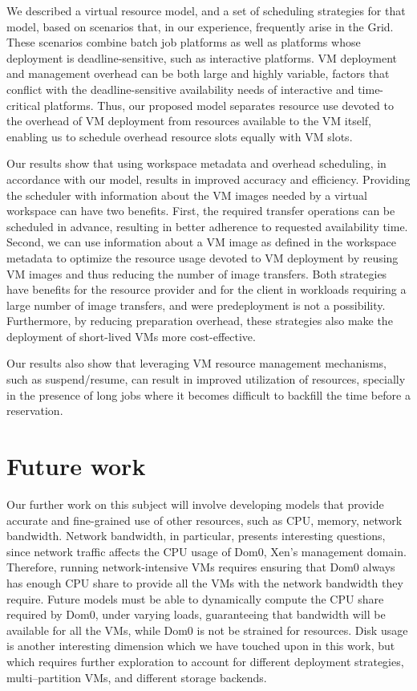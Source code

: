 We described a virtual resource model, and a set of scheduling
strategies for that model, based on scenarios that, in our experience,
frequently arise in the Grid. These scenarios combine batch job
platforms as well as platforms whose deployment is
deadline{}-sensitive, such as interactive platforms. VM deployment and
management overhead can be both large and highly variable, factors that
conflict with the deadline{}-sensitive availability needs of
interactive and time{}-critical platforms. Thus, our proposed model
separates resource use devoted to the overhead of VM deployment from
resources available to the VM itself, enabling us to schedule overhead
resource slots equally with VM slots.

Our results show that using workspace metadata and overhead scheduling, in accordance with our model, results in improved accuracy and efficiency. Providing the scheduler with information about the VM images needed by a virtual workspace can have two benefits. First, the required transfer operations can be scheduled in advance, resulting in better adherence to requested availability time. Second, we can use information about a VM image as defined in the workspace metadata to optimize the resource usage devoted to VM deployment by reusing VM images and thus reducing the number of image transfers. Both strategies have benefits for the resource provider and for the client in workloads requiring a large number of image transfers, and were predeployment is not a possibility. Furthermore, by reducing preparation overhead, these strategies also make the deployment of short{}-lived VMs more cost{}-effective.

Our results also show that leveraging VM resource management mechanisms, such as suspend/resume, can result in improved utilization of resources, specially in the presence of long jobs where it becomes difficult to backfill the time before a reservation.

\section{Future work}

Our further work on this subject will involve developing models that provide accurate and fine-grained use of other resources, such as CPU, memory, network bandwidth. Network bandwidth, in particular, presents interesting questions, since network traffic affects the CPU usage of Dom0, Xen's management domain. Therefore, running network-intensive VMs requires ensuring that Dom0 always has enough CPU share to provide all the VMs with the network bandwidth they require. Future models must be able to dynamically compute the CPU share required by Dom0, under varying loads, guaranteeing that bandwidth will be available for all the VMs, while Dom0 is not be strained for resources. Disk usage is another interesting dimension which we have touched upon in this work, but which requires further exploration to account for different deployment strategies, multi--partition VMs, and different storage backends.

